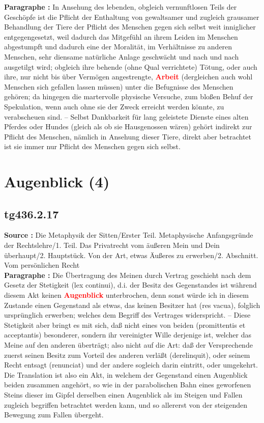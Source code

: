 \documentclass[a4paper,12pt,twoside]{book}
\newcommand{\match}[1]{\textcolor{red}{\textbf{#1}}}
\newcommand{\unnumberedsection}[1]{
	\section*{#1}
	\addcontentsline{toc}{section}{#1}
	\markright{#1}
}
\begin{document}
	\textbf{Paragraphe : }In Ansehung des lebenden, obgleich vernunftlosen Teils der Geschöpfe ist die Pflicht der Enthaltung von gewaltsamer  und zugleich grausamer Behandlung der Tiere der Pflicht des Menschen gegen sich selbst weit inniglicher entgegengesetzt, weil dadurch das Mitgefühl an ihrem Leiden im Menschen abgestumpft und dadurch eine der Moralität, im Verhältnisse zu anderen Menschen, sehr diensame natürliche Anlage geschwächt und nach und nach ausgetilgt wird; obgleich ihre behende (ohne Qual verrichtete) Tötung, oder auch ihre, nur nicht bis über Vermögen angestrengte, \match{Arbeit} (dergleichen auch wohl Menschen sich gefallen lassen müssen) unter die Befugnisse des Menschen gehören; da hingegen die martervolle physische Versuche, zum bloßen Behuf der Spekulation, wenn auch ohne sie der Zweck erreicht werden könnte, zu verabscheuen sind. – Selbst Dankbarkeit für lang geleistete Dienste eines alten Pferdes oder Hundes (gleich als ob sie Hausgenossen wären) gehört indirekt zur Pflicht des Menschen, nämlich in Ansehung dieser Tiere, direkt aber betrachtet ist sie immer nur Pflicht des Menschen gegen sich selbst. 
	
	\unnumberedsection{Augenblick (4)} 
	\subsection*{tg436.2.17} 
	\textbf{Source : }Die Metaphysik der Sitten/Erster Teil. Metaphysische Anfangsgründe der Rechtslehre/1. Teil. Das Privatrecht vom äußeren Mein und Dein überhaupt/2. Hauptstück. Von der Art, etwas Äußeres zu erwerben/2. Abschnitt. Vom persönlichen Recht\\  
	
	\textbf{Paragraphe : }Die Übertragung des Meinen durch Vertrag geschieht nach dem Gesetz der Stetigkeit (lex continui), d.i. der Besitz des Gegenstandes ist während diesem Akt keinen \match{Augenblick} unterbrochen, denn sonst würde ich in diesem Zustande einen Gegenstand als etwas, das keinen Besitzer hat (res vacua), folglich ursprünglich erwerben; welches dem Begriff des Vertrages widerspricht. – Diese Stetigkeit aber bringt es mit sich, daß nicht eines von beiden (promittentis et acceptantis) besonderer, sondern ihr vereinigter Wille derjenige ist, welcher das Meine auf den anderen überträgt; also nicht auf die Art: daß der Versprechende zuerst seinen Besitz zum Vorteil des anderen verläßt (derelinquit), oder seinem Recht entsagt (renunciat) und der andere sogleich darin eintritt, oder umgekehrt. Die Translation ist also ein Akt, in welchem der Gegenstand einen Augenblick beiden zusammen angehört, so wie in der parabolischen Bahn eines geworfenen Steins dieser im Gipfel derselben einen Augenblick als im Steigen und Fallen zugleich begriffen betrachtet werden kann, und so allererst von der steigenden Bewegung zum Fallen übergeht. 
	
\end{document}
